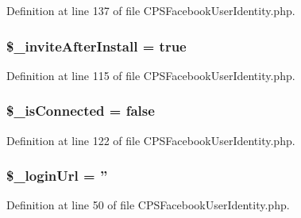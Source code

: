 Definition at line 137 of file CPSFacebookUserIdentity.php.

\hypertarget{classCPSFacebookUserIdentity_a06deb2baf54257cacaf8cbc83f9bf1a1}{
\subsubsection[{\$\_\-inviteAfterInstall}]{\setlength{\rightskip}{0pt plus 5cm}\$\_\-inviteAfterInstall = true}}
\label{classCPSFacebookUserIdentity_a06deb2baf54257cacaf8cbc83f9bf1a1}


Definition at line 115 of file CPSFacebookUserIdentity.php.

\hypertarget{classCPSFacebookUserIdentity_a3fb00b079c40b68e2ce79a0c27aad663}{
\subsubsection[{\$\_\-isConnected}]{\setlength{\rightskip}{0pt plus 5cm}\$\_\-isConnected = false}}
\label{classCPSFacebookUserIdentity_a3fb00b079c40b68e2ce79a0c27aad663}


Definition at line 122 of file CPSFacebookUserIdentity.php.

\hypertarget{classCPSFacebookUserIdentity_ad0039d9d92917bd2c7e46c93d8562b8b}{
\subsubsection[{\$\_\-loginUrl}]{\setlength{\rightskip}{0pt plus 5cm}\$\_\-loginUrl = ''}}
\label{classCPSFacebookUserIdentity_ad0039d9d92917bd2c7e46c93d8562b8b}


Definition at line 50 of file CPSFacebookUserIdentity.php.

